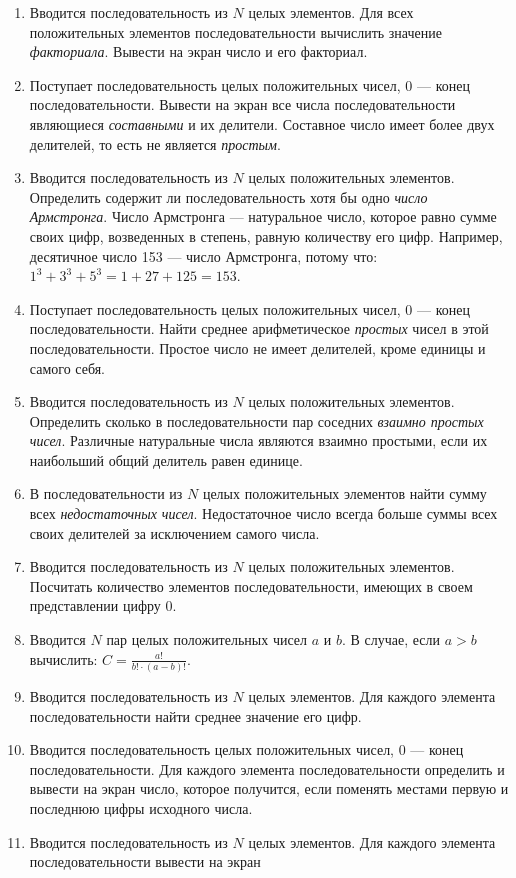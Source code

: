 \begin{enumerate}
\item Вводится последовательность из $N$ целых элементов. Для всех положительных элементов последовательности вычислить
значение \emph{факториала}. Вывести на экран число и его факториал.
\item Поступает последовательность целых положительных чисел, 0 --- конец последовательности. Вывести на экран все числа
последовательности являющиеся \emph{составными} и их делители. Составное число имеет более двух делителей,
то есть не является \emph{простым}.
\item Вводится последовательность из $N$ целых положительных элементов. Определить содержит ли последовательность хотя бы
одно \emph{число Армстронга}. Число Армстронга --- натуральное число, которое равно сумме своих цифр,
возведенных в степень, равную количеству его цифр. Например, десятичное число 153 --- число Армстронга, потому что: 
$1^3+3^3+5^3=1+27+125=153.$ 
\item Поступает последовательность целых положительных чисел, 0 --- конец последовательности. Найти среднее арифметическое
\emph{простых} чисел в этой последовательности. Простое число не имеет делителей, кроме единицы и самого
себя.
\item Вводится последовательность из $N$ целых положительных элементов. Определить сколько в последовательности пар
соседних \emph{взаимно простых чисел}. Различные натуральные числа являются взаимно простыми, если их
наибольший общий делитель равен единице.
\item В последовательности из $N$ целых положительных элементов найти сумму всех \emph{недостаточных чисел}.
Недостаточное число всегда больше суммы всех своих делителей за исключением самого числа.
\item Вводится последовательность из $N$ целых положительных элементов. Посчитать количество элементов последовательности,
имеющих в своем представлении цифру 0.
\item Вводится $N$ пар целых положительных чисел $a$ и $b$. В случае, если
$a>b$ вычислить:
 $C=\frac{a!}{b!\cdot (a-b)!}$.
\item Вводится последовательность из $N$ целых элементов. Для каждого элемента последовательности найти среднее значение
его цифр.
\item Вводится последовательность целых положительных чисел, 0 --- конец последовательности. Для каждого элемента
последовательности определить и вывести на экран число, которое получится, если поменять местами первую и последнюю
цифры исходного числа.
\item Вводится последовательность из $N$ целых элементов. Для каждого элемента последовательности вывести на экран

\end{enumerate}
